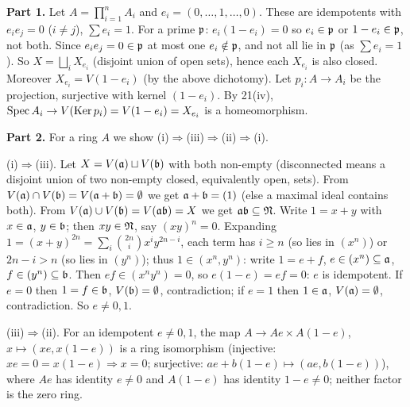 \documentclass[11pt]{article}
\begin{document}
\pf
\textbf{Part 1.} Let $A=\prod_{i=1}^nA_i$ and $e_i=(0,\dots,1,\dots,0)$. These are idempotents with $e_ie_j=0$ ($i\ne j$), $\sum e_i=1$. For a prime $\mathfrak p$: $e_i(1-e_i)=0$ so $e_i\in\mathfrak p$ or $1-e_i\in\mathfrak p$, not both. Since $e_ie_j=0\in\mathfrak p$ at most one $e_i\notin\mathfrak p$, and not all lie in $\mathfrak p$ (as $\sum e_i=1$). So $X=\bigsqcup_iX_{e_i}$ (disjoint union of open sets), hence each $X_{e_i}$ is also closed. Moreover $X_{e_i}=V(1-e_i)$ (by the above dichotomy). Let $p_i:A\to A_i$ be the projection, surjective with kernel $(1-e_i)$. By 21(iv), $\operatorname{Spec} A_i\to V(\operatorname{Ker} p_i)=V(1-e_i)=X_{e_i}$ is a homeomorphism.

\textbf{Part 2.} For a ring $A$ we show (i)$\Rightarrow$(iii)$\Rightarrow$(ii)$\Rightarrow$(i).

(i)$\Rightarrow$(iii). Let $X=V(\mathfrak a)\sqcup V(\mathfrak b)$ with both non-empty (disconnected means a disjoint union of two non-empty closed, equivalently open, sets). From $V(\mathfrak a)\cap V(\mathfrak b)=V(\mathfrak a+\mathfrak b)=\emptyset$ we get $\mathfrak a+\mathfrak b=(1)$ (else a maximal ideal contains both). From $V(\mathfrak a)\cup V(\mathfrak b)=V(\mathfrak a\mathfrak b)=X$ we get $\mathfrak a\mathfrak b\subseteq\mathfrak N$. Write $1=x+y$ with $x\in\mathfrak a$, $y\in\mathfrak b$; then $xy\in\mathfrak N$, say $(xy)^n=0$. Expanding $1=(x+y)^{2n}=\sum_i\binom{2n}{i}x^iy^{2n-i}$, each term has $i\ge n$ (so lies in $(x^n)$) or $2n-i>n$ (so lies in $(y^n)$); thus $1\in(x^n,y^n)$: write $1=e+f$, $e\in(x^n)\subseteq\mathfrak a$, $f\in(y^n)\subseteq\mathfrak b$. Then $ef\in(x^ny^n)=0$, so $e(1-e)=ef=0$: $e$ is idempotent. If $e=0$ then $1=f\in\mathfrak b$, $V(\mathfrak b)=\emptyset$, contradiction; if $e=1$ then $1\in\mathfrak a$, $V(\mathfrak a)=\emptyset$, contradiction. So $e\ne0,1$.

(iii)$\Rightarrow$(ii). For an idempotent $e\ne0,1$, the map $A\to Ae\times A(1-e)$, $x\mapsto(xe,x(1-e))$ is a ring isomorphism (injective: $xe=0=x(1-e)\Rightarrow x=0$; surjective: $ae+b(1-e)\mapsto(ae,b(1-e))$), where $Ae$ has identity $e\ne0$ and $A(1-e)$ has identity $1-e\ne0$; neither factor is the zero ring.
\end{document}
